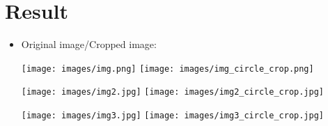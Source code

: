 \section{Result}
\begin{itemize}
    \item Original image/Cropped image:
    \begin{center}
        \texttt{[image: images/img.png]}
        \texttt{[image: images/img\_circle\_crop.png]}
    \end{center} 
    \begin{center}
        \texttt{[image: images/img2.jpg]}
        \texttt{[image: images/img2\_circle\_crop.jpg]}
    \end{center} 
    \begin{center}
        \texttt{[image: images/img3.jpg]}
        \texttt{[image: images/img3\_circle\_crop.jpg]}
    \end{center} 
\end{itemize}